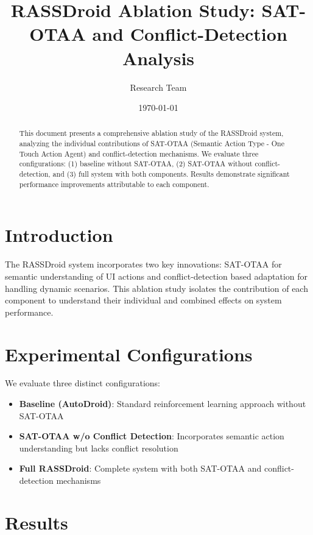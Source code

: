 \documentclass{article}
\title{RASSDroid Ablation Study: SAT-OTAA and Conflict-Detection Analysis}
\author{Research Team}
\date{\today}
\begin{document}
\maketitle

\begin{abstract}
This document presents a comprehensive ablation study of the RASSDroid system, analyzing the individual contributions of SAT-OTAA (Semantic Action Type - One Touch Action Agent) and conflict-detection mechanisms. We evaluate three configurations: (1) baseline without SAT-OTAA, (2) SAT-OTAA without conflict-detection, and (3) full system with both components. Results demonstrate significant performance improvements attributable to each component.
\end{abstract}

\section{Introduction}

The RASSDroid system incorporates two key innovations: SAT-OTAA for semantic understanding of UI actions and conflict-detection based adaptation for handling dynamic scenarios. This ablation study isolates the contribution of each component to understand their individual and combined effects on system performance.

\section{Experimental Configurations}

We evaluate three distinct configurations:

\begin{itemize}
    \item \textbf{Baseline (AutoDroid)}: Standard reinforcement learning approach without SAT-OTAA
    \item \textbf{SAT-OTAA w/o Conflict Detection}: Incorporates semantic action understanding but lacks conflict resolution
    \item \textbf{Full RASSDroid}: Complete system with both SAT-OTAA and conflict-detection mechanisms
\end{itemize}

\section{Results}
\end{document}
